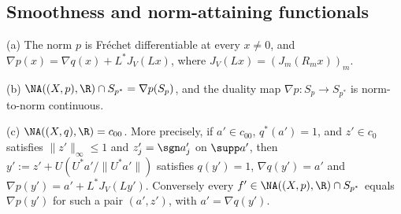 \subsection{Smoothness and norm-attaining functionals}

\begin{proposition}\label{prop:smooth}
\textup{(a)} The norm $p$ is Fr\'echet differentiable at every $x\neq0$,
and $\nabla p(x)=\nabla q(x)+L^*J_V(Lx)$, where $J_V(Lx)=(J_m(R_mx))_m$.

\textup{(b)} $\NA((X,p),\R)\cap S_{p^*}=\nabla p(S_p)$, and the duality map
$\nabla p:S_p\to S_{p^*}$ is norm-to-norm continuous.

\textup{(c)} $\NA((X,q),\R)=c_{00}$.  More precisely, if $a'\in c_{00}$,
$q^*(a')=1$, and $z'\in c_0$ satisfies $\|z'\|_\infty\le1$ and
$z'_j=\sgn a'_j$ on $\supp a'$, then $y':=z'+U(U^*a'/\|U^*a'\|)$ satisfies
$q(y')=1$, $\nabla q(y')=a'$ and $\nabla p(y')=a'+L^*J_V(Ly')$.
Conversely every $f'\in\NA((X,p),\R)\cap S_{p^*}$ equals $\nabla p(y')$ for
such a pair $(a',z')$, with $a'=\nabla q(y')$.
\end{proposition}

